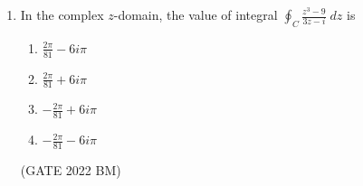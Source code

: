 \begin{enumerate}[label=\thechapter.\arabic*,ref=\thechapter.\theenumi]
\item In the complex $z$-domain, the value of integral $\oint_{C}\frac{z^3-9}{3z-i}\;dz$ is   \\
\begin{enumerate}[label=(\alph*)]
    \item $\frac{2\pi}{81}-6i\pi$ 
    \item $\frac{2\pi}{81}+6i\pi$ 
    \item $-\frac{2\pi}{81}+6i\pi$ 
    \item $-\frac{2\pi}{81}-6i\pi$ 
\end{enumerate} \hfill(GATE 2022 BM)    \\
\solution

\newpage
\end{enumerate}
